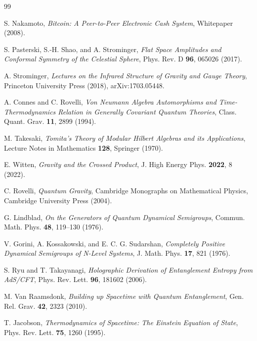 \documentclass[10pt,twocolumn,a4paper]{article}
\theoremstyle{plain}
\theoremstyle{definition}
\theoremstyle{remark}
\begin{document}
\twocolumn
\begin{thebibliography}{99}
\footnotesize

S. Nakamoto, \textit{Bitcoin: A Peer-to-Peer Electronic Cash System}, Whitepaper (2008).

S. Pasterski, S.-H. Shao, and A. Strominger, \textit{Flat Space Amplitudes and Conformal Symmetry of the Celestial Sphere}, Phys. Rev. D \textbf{96}, 065026 (2017).

A. Strominger, \textit{Lectures on the Infrared Structure of Gravity and Gauge Theory}, Princeton University Press (2018), arXiv:1703.05448.

A. Connes and C. Rovelli, \textit{Von Neumann Algebra Automorphisms and Time-Thermodynamics Relation in Generally Covariant Quantum Theories}, Class. Quant. Grav. \textbf{11}, 2899 (1994).

M. Takesaki, \textit{Tomita's Theory of Modular Hilbert Algebras and its Applications}, Lecture Notes in Mathematics \textbf{128}, Springer (1970).

E. Witten, \textit{Gravity and the Crossed Product}, J. High Energy Phys. \textbf{2022}, 8 (2022).

C. Rovelli, \textit{Quantum Gravity}, Cambridge Monographs on Mathematical Physics, Cambridge University Press (2004).

G. Lindblad, \textit{On the Generators of Quantum Dynamical Semigroups}, Commun. Math. Phys. \textbf{48}, 119–130 (1976).

V. Gorini, A. Kossakowski, and E. C. G. Sudarshan, \textit{Completely Positive Dynamical Semigroups of N-Level Systems}, J. Math. Phys. \textbf{17}, 821 (1976).

S. Ryu and T. Takayanagi, \textit{Holographic Derivation of Entanglement Entropy from AdS/CFT}, Phys. Rev. Lett. \textbf{96}, 181602 (2006).

M. Van Raamsdonk, \textit{Building up Spacetime with Quantum Entanglement}, Gen. Rel. Grav. \textbf{42}, 2323 (2010).

T. Jacobson, \textit{Thermodynamics of Spacetime: The Einstein Equation of State}, Phys. Rev. Lett. \textbf{75}, 1260 (1995).


\end{thebibliography}
\end{document}
